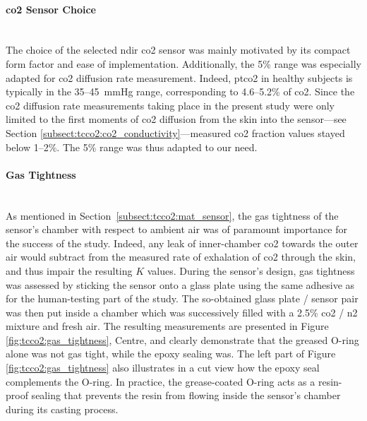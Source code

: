 \paragraph{\texorpdfstring{\gls{co2}}{CO2} Sensor Choice}\makebox{}\\

The choice of the selected \gls{ndir} \gls{co2} sensor was mainly motivated by its compact form factor and ease of implementation. Additionally, the 5\% range was especially adapted for \gls{co2} diffusion rate measurement. Indeed, \gls{ptco2} in healthy subjects is typically in the 35--45~mmHg range\cite{rithalia1984}, corresponding to 4.6--5.2\% of \gls{co2}. Since the \gls{co2} diffusion rate measurements taking place in the present study were only limited to the first moments of \gls{co2} diffusion from the skin into the sensor---see Section \ref{subsect:tcco2:co2_conductivity}---measured \gls{co2} fraction values stayed below 1--2\%. The 5\% range was thus adapted to our need.

\paragraph{Gas Tightness}\label{subsect:tcco2:gas_tightness}\makebox{}\\

As mentioned in Section~\ref{subsect:tcco2:mat_sensor}, the gas tightness of the sensor's chamber with respect to ambient air was of paramount importance for the success of the study. Indeed, any leak of inner-chamber \gls{co2} towards the outer air would subtract from the measured rate of exhalation of \gls{co2} through the skin, and thus impair the resulting $K$ values. During the sensor's design, gas tightness was assessed by sticking the sensor onto a glass plate using the same adhesive as for the human-testing part of the study. The so-obtained glass plate / sensor pair was then put inside a chamber which was successively filled with a 2.5\% \gls{co2} / \gls{n2} mixture and fresh air. The resulting measurements are presented in Figure \ref{fig:tcco2:gas_tightness}, Centre, and clearly demonstrate that the greased O-ring alone was not gas tight, while the epoxy sealing was. The left part of Figure \ref{fig:tcco2:gas_tightness} also illustrates in a cut view how the epoxy seal complements the O-ring. In practice, the grease-coated O-ring acts as a resin-proof sealing that prevents the resin from flowing inside the sensor's chamber during its casting process.

